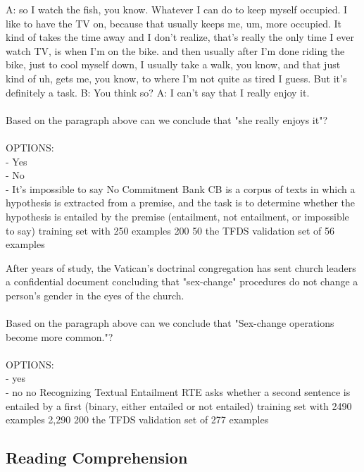 \taskio
{A: so I watch the fish, you know. Whatever I can do to keep myself occupied. I like to have the TV on, because that usually keeps me, um, more occupied. It kind of takes the time away and I don't realize, that's really the only time I ever watch TV, is when I'm on the bike. and then usually after I'm done riding the bike, just to cool myself down, I usually take a walk, you know, and that just kind of uh, gets me, you know, to where I'm not quite as tired I guess. But it's definitely a task. B: You think so? A: I can't say that I really enjoy it.\\\\Based on the paragraph above can we conclude that "she really enjoys it"?\\\\OPTIONS:\\- Yes\\- No\\- It's impossible to say}
{No}
{
    \taskdescription
    {Commitment Bank} %
    {CB} %
    {\citep{de2019commitmentbank}} %
    {is a corpus of texts in which a hypothesis is extracted from a premise, and the task is to determine whether the hypothesis is entailed by the premise (entailment, not entailment, or impossible to say)} %
    {training set with 250 examples} %
    {200} %
    {50} %
    {the TFDS validation set of 56 examples} %
}



\taskio
{After years of study, the Vatican's doctrinal congregation has sent church leaders a confidential document concluding that "sex-change" procedures do not change a person's gender in the eyes of the church.\\\\Based on the paragraph above can we conclude that "Sex-change operations become more common."?\\\\OPTIONS:\\- yes\\- no}
{no}
{
    \taskdescription
    {Recognizing Textual Entailment} %
    {RTE} %
    {\citep{10.1007/11736790_9,haim2006second,giampiccolo-etal-2007-third,bentivogli2009fifth}} %
    {asks whether a second sentence is entailed by a first (binary, either entailed or not entailed)} %
    {training set with 2490 examples} %
    {2,290} %
    {200} %
    {the TFDS validation set of 277 examples} %
}




\clearpage 
\subsection{Reading Comprehension}\label{appen:b-reading-comp}

